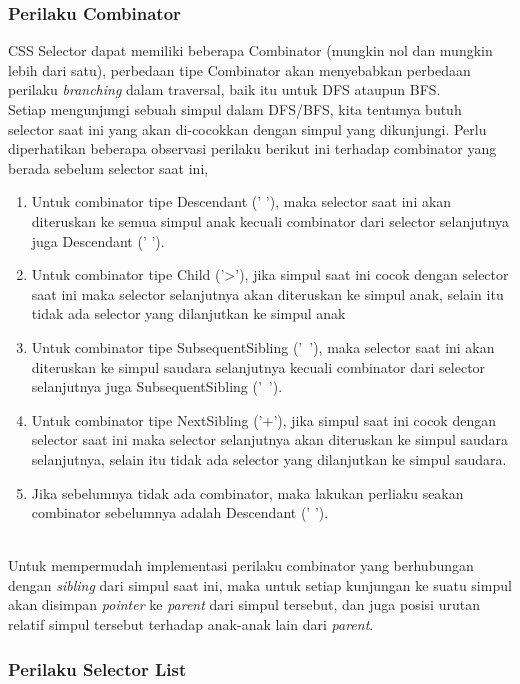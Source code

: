 \documentclass[12pt,a4paper]{article}
\begin{document}
\begin{itemize}
\subsubsection{Perilaku Combinator}

CSS Selector dapat memiliki beberapa Combinator (mungkin nol dan mungkin lebih dari satu), 
perbedaan tipe Combinator akan menyebabkan perbedaan perilaku \textit{branching} dalam traversal, baik itu untuk DFS ataupun BFS. \\

Setiap mengunjungi sebuah simpul dalam DFS/BFS, kita tentunya butuh selector saat ini yang akan di-cocokkan dengan simpul yang dikunjungi.
Perlu diperhatikan beberapa observasi perilaku berikut ini terhadap combinator yang berada sebelum selector saat ini,
\begin{enumerate}
    \item Untuk combinator tipe Descendant (' '), maka selector saat ini akan diteruskan ke semua simpul anak kecuali combinator dari selector selanjutnya juga Descendant (' ').
    \item Untuk combinator tipe Child ('>'), jika simpul saat ini cocok dengan selector saat ini maka selector selanjutnya akan diteruskan ke simpul anak, selain itu tidak ada selector yang dilanjutkan ke simpul anak
    \item Untuk combinator tipe SubsequentSibling ('~'), maka selector saat ini akan diteruskan ke simpul saudara selanjutnya kecuali combinator dari selector selanjutnya juga SubsequentSibling ('~').
    \item Untuk combinator tipe NextSibling ('+'), jika simpul saat ini cocok dengan selector saat ini maka selector selanjutnya akan diteruskan ke simpul saudara selanjutnya, selain itu tidak ada selector yang dilanjutkan ke simpul saudara.
    \item Jika sebelumnya tidak ada combinator, maka lakukan perliaku seakan combinator sebelumnya adalah Descendant (' ').
\end{enumerate} \\

Untuk mempermudah implementasi perilaku combinator yang berhubungan dengan \textit{sibling} dari simpul saat ini,
maka untuk setiap kunjungan ke suatu simpul akan disimpan \textit{pointer} ke \textit{parent} dari simpul tersebut,
dan juga posisi urutan relatif simpul tersebut terhadap anak-anak lain dari \textit{parent}.


\subsubsection{Perilaku Selector List}


\end{itemize}
\end{document}
